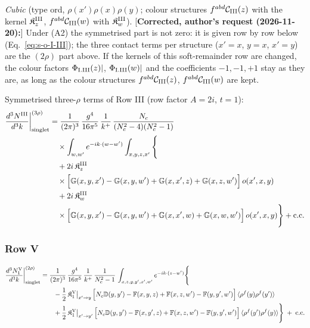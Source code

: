 \documentclass[9pt]{article}
\def\mf#1{\mathbb{#1}}
\numberwithin{equation}{section}
\begin{document}
{\emph{Cubic} (type ord, $\rho(x')\rho(x)\rho(y)$; colour structures $f^{abd}\mathcal{C}_{\rm III}(z)$ with the kernel $\mathfrak{K}^{\rm III}_{z}$, $f^{abd}\mathcal{C}_{\rm III}(w)$ with $\mathfrak{K}^{\rm III}_{w}$). [\textbf{Corrected, author's request (2026-11-20):}] Under (A2) the symmetrised part is not zero: it is given row by row below (Eq.~\eqref{eq:s-o-I-III}); the three contact terms per structure ($x'=x$, $y=x$, $x'=y$) are the $(2\rho)$ part above. If the kernels of this soft-remainder row are changed, the colour factors $\Phi_{\rm I.III}(z)|$, $\Phi_{\rm I.III}(w)|$ and the coefficients $-1,-1,+1$ stay as they are, as long as the colour structures $f^{abd}\mathcal{C}_{\rm III}(z)$, $f^{abd}\mathcal{C}_{\rm III}(w)$ are kept.

 Symmetrised three-$\rho$ terms of Row III (row factor $A=2i$, $t=1$):
\begin{align}
\frac{d^{3}N^{\rm III}}{d^{3}k}\bigg|^{(3\rho)}_{\rm singlet}&=\frac{1}{(2\pi)^{3}}\,\frac{g^{4}}{16\pi^{5}}\,\frac{1}{k^{+}}\,\frac{N_{c}}{(N_{c}^{2}-4)(N_{c}^{2}-1)}\notag\\
&\quad\times\int_{w,w'}e^{-ik\cdot(w-w')}\int_{x,y,z,x'}\Bigg\{\notag\\
&\quad+2i\,\mathfrak{K}^{\rm III}_{z}\notag\\
&\quad\times\Big[\mf{G}(x,y,x')-\mf{G}(x,y,w')+\mf{G}(x,x',z)+\mf{G}(x,z,w')\Big]\,o(x',x,y)\notag\\
&\quad+2i\,\mathfrak{K}^{\rm III}_{w}\notag\\
&\quad\times\Big[\mf{G}(x,y,x')-\mf{G}(x,y,w')+\mf{G}(x,x',w)+\mf{G}(x,w,w')\Big]\,o(x',x,y)\Bigg\}+{\rm c.c.}\label{eq:s-o-I-III}
\end{align}

\subsubsection*{Row V}

\begin{align}
\frac{d^{3}N_{1}^{\rm V}}{d^{3}k}\bigg|^{(2\rho)}_{\rm singlet}&=\frac{1}{(2\pi)^{3}}\,\frac{g^{4}}{16\pi^{5}}\,\frac{1}{k^{+}}\,\frac{1}{N_{c}^{2}-1}\,\int_{x,z,y,y',x',w'}e^{-ik\cdot(z-w')}\Bigg\{\notag\\
&\qquad -\frac{1}{2}\,\mathfrak{K}^{\rm V}_{1}\big|_{x'\to y}\,\Big[N_{c}\mf{D}(y,y')-\mf{F}(x,y,z)+\mf{F}(x,z,w')-\mf{F}(y,y',w')\Big]\,\langle\rho^{f}(y)\rho^{f}(y')\rangle\notag\\
&\qquad +\frac{1}{2}\,\mathfrak{K}^{\rm V}_{1}\big|_{x'\to y'}\,\Big[N_{c}\mf{D}(y,y')-\mf{F}(x,y',z)+\mf{F}(x,z,w')-\mf{F}(y,y',w')\Big]\,\langle\rho^{f}(y')\rho^{f}(y)\rangle\Bigg\}\;+\;{\rm c.c.}\label{eq:s-I-V-1}
\end{align}

}
\end{document}
